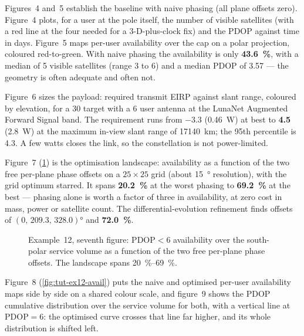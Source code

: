 Figures~4 and~5 establish the baseline with naive phasing (all plane offsets
zero). Figure~4 plots, for a user at the pole itself, the number of visible
satellites (with a red line at the four needed for a 3-D-plus-clock fix) and the
PDOP against time in days. Figure~5 maps per-user availability over the cap on a
polar projection, coloured red-to-green. With naive phasing the availability is
only \textbf{\SI{43.6}{\percent}}, with a median of 5 visible satellites (range
3 to 6) and a median PDOP of 3.57 --- the geometry is often adequate and often
not.

Figure~6 sizes the payload: required transmit EIRP against slant range, coloured
by elevation, for a \SI{30}{\dBHz} target with a \SI{6}{\dBi} user antenna at
the LunaNet Augmented Forward Signal band. The requirement runs from
\SI{-3.3}{\dBW} (\SI{0.46}{\watt}) at best to \textbf{\SI{4.5}{\dBW}}
(\SI{2.8}{\watt}) at the maximum in-view slant range of
\SI{17140}{\kilo\meter}; the 95th percentile is \SI{4.3}{\dBW}. A few watts
closes the link, so the constellation is not power-limited.

Figure~7 (\cref{fig:tut-ex12-land}) is the optimisation landscape: availability
as a function of the two free per-plane phase offsets on a
$25\times25$ grid (about \SI{15}{\degree} resolution), with the grid optimum
starred. It spans \textbf{\SI{20.2}{\percent}} at the worst phasing to
\textbf{\SI{69.2}{\percent}} at the best --- phasing alone is worth a factor of
three in availability, at zero cost in mass, power or satellite count. The
differential-evolution refinement finds offsets of
$(0,\,209.3,\,328.0)\si{\degree}$ and \textbf{\SI{72.0}{\percent}}.

\begin{figure}[htbp]
  \centering
  \caption{Example~12, seventh figure: $\mathrm{PDOP}<6$ availability over the
           south-polar service volume as a function of the two free per-plane
           phase offsets. The landscape spans \SIrange{20}{69}{\percent}.}
  \label{fig:tut-ex12-land}
\end{figure}

Figure~8 (\cref{fig:tut-ex12-avail}) puts the naive and optimised per-user
availability maps side by side on a shared colour scale, and figure~9 shows the
PDOP cumulative distribution over the service volume for both, with a vertical
line at $\mathrm{PDOP}=6$: the optimised curve crosses that line far higher, and
its whole distribution is shifted left.

